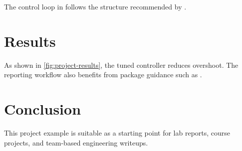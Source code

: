 \documentclass[titlepage=formal,code=listings]{../SUSTechHomework}
\begin{document}
The control loop in  follows the structure
recommended by \textcite{franklin-feedback}.

\section{Results}

\begin{sustechfiguregroup}
  \begin{sustechsubfigure}[0.48\linewidth][Baseline]
    \sustechplaceholdergraphic[0.92\linewidth][3cm]
  \end{sustechsubfigure}
  \sustechfloatsep
  \begin{sustechsubfigure}[0.48\linewidth][Improved]
    \sustechplaceholdergraphic[0.92\linewidth][3cm]
  \end{sustechsubfigure}
  \caption{Controller performance comparison}
  \label{fig:project-results}
\end{sustechfiguregroup}

As shown in \cref{fig:project-results}, the tuned controller reduces overshoot.
The reporting workflow also benefits from package guidance such as
\parencite{ctan-biblatex}.

\section{Conclusion}

This project example is suitable as a starting point for lab reports, course
projects, and team-based engineering writeups.

\sustechprintbibliography
\end{document}
